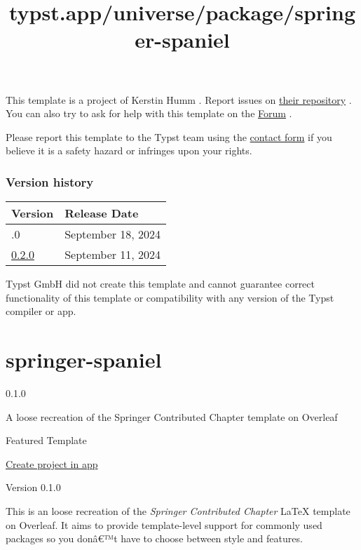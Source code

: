 This template is a project of Kerstin Humm . Report issues on
\href{https://github.com/erictapen/typst-invoice}{their repository} .
You can also try to ask for help with this template on the
\href{https://forum.typst.app}{Forum} .

Please report this template to the Typst team using the
\href{https://typst.app/contact}{contact form} if you believe it is a
safety hazard or infringes upon your rights.

\label{versions}
\subsubsection{Version history}\label{version-history}

\begin{longtable}[]{@{}ll@{}}
\toprule\noalign{}
Version & Release Date \\
\midrule\noalign{}
\endhead
\bottomrule\noalign{}
\endlastfoot
0.3.0 & September 18, 2024 \\
\href{https://typst.app/universe/package/classy-german-invoice/0.2.0/}{0.2.0}
& September 11, 2024 \\
\end{longtable}

Typst GmbH did not create this template and cannot guarantee correct
functionality of this template or compatibility with any version of the
Typst compiler or app.


\title{typst.app/universe/package/springer-spaniel}

\label{banner}
\label{template-thumbnail}

\section{springer-spaniel}\label{springer-spaniel}

{ 0.1.0 }

A loose recreation of the Springer Contributed Chapter template on
Overleaf

{ } Featured Template

\href{/app?template=springer-spaniel&version=0.1.0}{Create project in
app}

\label{readme}
Version 0.1.0

This is an loose recreation of the \emph{Springer Contributed Chapter}
LaTeX template on Overleaf. It aims to provide template-level support
for commonly used packages so you donâ€™t have to choose between style
and features.

